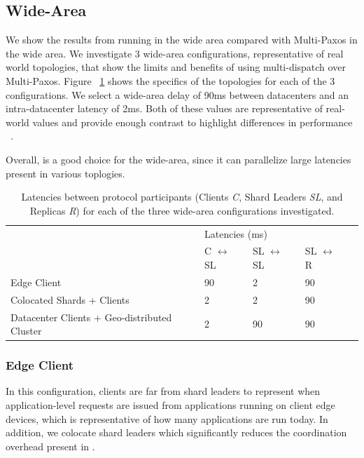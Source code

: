 \subsection{Wide-Area}
We show the results from running \sys{} in the wide area compared with Multi-Paxos in the wide area. We investigate 3 wide-area configurations, representative of real world topologies, that show the limits and benefits of using multi-dispatch over Multi-Paxos. Figure ~\ref{table:wan} shows the specifics of the topologies for each of the 3 configurations. We select a wide-area delay of 90ms between datacenters and an intra-datacenter latency of 2ms. Both of these values are representative of real-world values and provide enough contrast to highlight differences in performance ~\cite{}. 

Overall, \sys{} is a good choice for the wide-area, since it can parallelize large latencies present in various toplogies.


\begin{table}[]
\begin{tabular}{lllll}
                 & \multicolumn{3}{l}{Latencies (ms)}                                        &  \\
                 & C $\leftrightarrow$ SL & SL $\leftrightarrow$ SL & SL $\leftrightarrow$ R &  \\
Edge Client  & 90                     & 2                       & 90                     &  \\
Colocated Shards + Clients & 2                      & 2                       & 90                     &  \\
Datacenter Clients + Geo-distributed Cluster  & 2                      & 90                      & 90                     & 
\end{tabular}
\label{table:wan}
\caption{Latencies between protocol participants (Clients \textit{C}, Shard Leaders \textit{SL}, and Replicas \textit{R}) for each of the three wide-area configurations investigated.}
\end{table}

\subsubsection{Edge Client}
In this configuration, clients are far from shard leaders to represent when application-level requests are issued from applications running on client edge devices, which is representative of how many applications are run today. In addition, we colocate shard leaders which significantly reduces the coordination overhead present in \sys{}.

